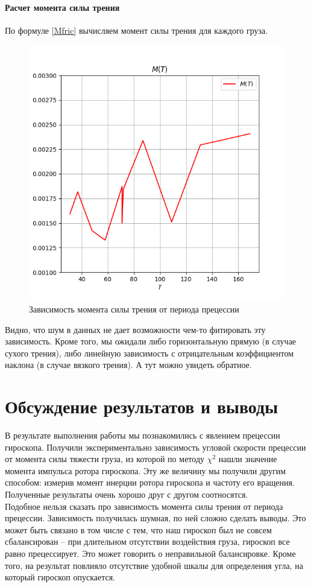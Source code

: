 \documentclass[a4paper,12pt]{article}
\begin{document}
	\paragraph{Расчет момента силы трения}
	
	По формуле \eqref{Mfric} вычисляем момент силы трения для каждого груза. 
	
	\begin{figure}[H]
		\centering
		\includegraphics[width=0.7\linewidth]{fig3}
		\caption{Зависимость момента силы трения от периода прецессии}
		\label{fig:fig3}
	\end{figure}
	
	Видно, что шум в данных не дает возможности чем-то фитировать эту зависимость. Кроме того, мы ожидали либо горизонтальную прямую (в случае сухого трения), либо линейную зависимость с отрицательным коэффициентом наклона (в случае вязкого трения). А тут можно увидеть обратное.
	
	\section{Обсуждение результатов и выводы}
	В результате выполнения работы мы познакомились с явлением прецессии гироскопа. Получили экспериментально зависимость угловой скорости прецессии от момента силы тяжести груза, из которой по методу $\chi^2$ нашли значение момента импульса ротора гироскопа. Эту же величину мы получили другим способом: измерив момент инерции ротора гироскопа и частоту его вращения. Полученные результаты очень хорошо друг с другом соотносятся.\\
	
	Подобное нельзя сказать про зависимость момента силы трения от периода прецессии. Зависимость получилась шумная, по ней сложно сделать выводы. Это может быть связано в том числе с тем, что наш гироскоп был не совсем сбалансирован -- при длительном отсутствии воздействия груза, гироскоп все равно прецессирует. Это может говорить о неправильной балансировке. Кроме того, на результат повлияло отсутствие удобной шкалы для определения угла, на который гироскоп опускается.
	
\end{document}
